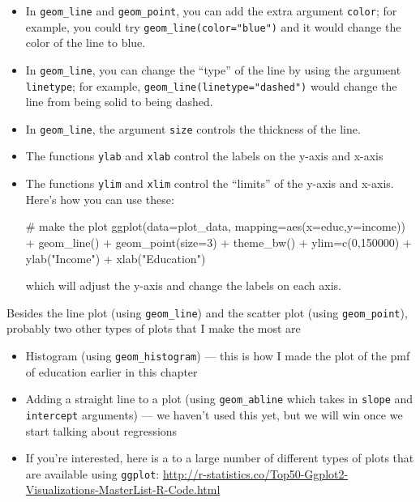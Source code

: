 \documentclass[
  letterpaper,
  DIV=11,
  numbers=noendperiod]{scrreprt}
\newenvironment{Shaded}{\begin{snugshade}}{\end{snugshade}}
\newcommand{\AttributeTok}[1]{\textcolor[rgb]{0.40,0.45,0.13}{#1}}
\newcommand{\CommentTok}[1]{\textcolor[rgb]{0.37,0.37,0.37}{#1}}
\newcommand{\DecValTok}[1]{\textcolor[rgb]{0.68,0.00,0.00}{#1}}
\newcommand{\FunctionTok}[1]{\textcolor[rgb]{0.28,0.35,0.67}{#1}}
\newcommand{\NormalTok}[1]{\textcolor[rgb]{0.00,0.23,0.31}{#1}}
\newcommand{\OtherTok}[1]{\textcolor[rgb]{0.00,0.23,0.31}{#1}}
\newcommand{\SpecialCharTok}[1]{\textcolor[rgb]{0.37,0.37,0.37}{#1}}
\newcommand{\StringTok}[1]{\textcolor[rgb]{0.13,0.47,0.30}{#1}}
\begin{document}
\begin{itemize}
\item
  In \texttt{geom\_line} and \texttt{geom\_point}, you can add the extra
  argument \texttt{color}; for example, you could try
  \texttt{geom\_line(color="blue")} and it would change the color of the
  line to blue.
\item
  In \texttt{geom\_line}, you can change the ``type'' of the line by
  using the argument \texttt{linetype}; for example,
  \texttt{geom\_line(linetype="dashed")} would change the line from
  being solid to being dashed.
\item
  In \texttt{geom\_line}, the argument \texttt{size} controls the
  thickness of the line.
\item
  The functions \texttt{ylab} and \texttt{xlab} control the labels on
  the y-axis and x-axis
\item
  The functions \texttt{ylim} and \texttt{xlim} control the ``limits''
  of the y-axis and x-axis. Here's how you can use these:

\begin{Shaded}
\begin{Highlighting}[]
\CommentTok{\# make the plot}
\FunctionTok{ggplot}\NormalTok{(}\AttributeTok{data=}\NormalTok{plot\_data,}
     \AttributeTok{mapping=}\FunctionTok{aes}\NormalTok{(}\AttributeTok{x=}\NormalTok{educ,}\AttributeTok{y=}\NormalTok{income)) }\SpecialCharTok{+}
  \FunctionTok{geom\_line}\NormalTok{() }\SpecialCharTok{+}
  \FunctionTok{geom\_point}\NormalTok{(}\AttributeTok{size=}\DecValTok{3}\NormalTok{) }\SpecialCharTok{+}
  \FunctionTok{theme\_bw}\NormalTok{() }\SpecialCharTok{+}
\NormalTok{  ylim}\OtherTok{=}\FunctionTok{c}\NormalTok{(}\DecValTok{0}\NormalTok{,}\DecValTok{150000}\NormalTok{) }\SpecialCharTok{+}
  \FunctionTok{ylab}\NormalTok{(}\StringTok{"Income"}\NormalTok{) }\SpecialCharTok{+}
  \FunctionTok{xlab}\NormalTok{(}\StringTok{"Education"}\NormalTok{)}
\end{Highlighting}
\end{Shaded}

  which will adjust the y-axis and change the labels on each axis.
\end{itemize}

Besides the line plot (using \texttt{geom\_line}) and the scatter plot
(using \texttt{geom\_point}), probably two other types of plots that I
make the most are

\begin{itemize}
\item
  Histogram (using \texttt{geom\_histogram}) --- this is how I made the
  plot of the pmf of education earlier in this chapter
\item
  Adding a straight line to a plot (using \texttt{geom\_abline} which
  takes in \texttt{slope} and \texttt{intercept} arguments) --- we
  haven't used this yet, but we will win once we start talking about
  regressions
\item
  If you're interested, here is a to a large number of different types
  of plots that are available using \texttt{ggplot}:
  \url{http://r-statistics.co/Top50-Ggplot2-Visualizations-MasterList-R-Code.html}
\end{itemize}
\end{document}
